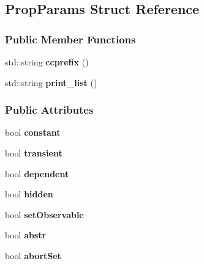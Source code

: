 \hypertarget{struct_prop_params}{}\subsection{Prop\+Params Struct Reference}
\label{struct_prop_params}
\subsubsection*{Public Member Functions}
\begin{DoxyCompactItemize}
\item 
\hypertarget{struct_prop_params_a973cc930ba1b9a3b06e50e016a95fe49}{}std\+::string {\bfseries ccprefix} ()\label{struct_prop_params_a973cc930ba1b9a3b06e50e016a95fe49}

\item 
\hypertarget{struct_prop_params_adbc6a66ae28631f32b857a337962916b}{}std\+::string {\bfseries print\+\_\+list} ()\label{struct_prop_params_adbc6a66ae28631f32b857a337962916b}

\end{DoxyCompactItemize}
\subsubsection*{Public Attributes}
\begin{DoxyCompactItemize}
\item 
\hypertarget{struct_prop_params_a07960c60fae2c9e32023b6f7959d45dc}{}bool {\bfseries constant}\label{struct_prop_params_a07960c60fae2c9e32023b6f7959d45dc}

\item 
\hypertarget{struct_prop_params_a076d47d2c80e5f89ae542e3014bbf41b}{}bool {\bfseries transient}\label{struct_prop_params_a076d47d2c80e5f89ae542e3014bbf41b}

\item 
\hypertarget{struct_prop_params_afe89765ae4b05527fa7fe2f7828489d3}{}bool {\bfseries dependent}\label{struct_prop_params_afe89765ae4b05527fa7fe2f7828489d3}

\item 
\hypertarget{struct_prop_params_a94dfbfd1bd27306e8c604e99df6e97e8}{}bool {\bfseries hidden}\label{struct_prop_params_a94dfbfd1bd27306e8c604e99df6e97e8}

\item 
\hypertarget{struct_prop_params_af74a8d27602b5ee573535f6447addb22}{}bool {\bfseries set\+Observable}\label{struct_prop_params_af74a8d27602b5ee573535f6447addb22}

\item 
\hypertarget{struct_prop_params_aebb5b70e36ef7760f13696736f54efec}{}bool {\bfseries abstr}\label{struct_prop_params_aebb5b70e36ef7760f13696736f54efec}

\item 
\hypertarget{struct_prop_params_a160d416ac98ec8d2349f065899ed7fef}{}bool {\bfseries abort\+Set}\label{struct_prop_params_a160d416ac98ec8d2349f065899ed7fef}

\end{DoxyCompactItemize}
